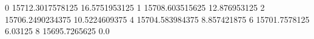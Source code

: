 0 15712.3017578125 16.5751953125
1 15708.603515625 12.876953125
2 15706.2490234375 10.5224609375
4 15704.583984375 8.857421875
6 15701.7578125 6.03125
8 15695.7265625 0.0
